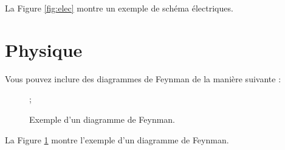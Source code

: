 \noindent La Figure \ref{fig:elec} montre un exemple de schéma électriques.

\section{Physique}

Vous pouvez inclure des diagrammes de Feynman de la manière suivante :

\begin{figure}[H]
  \centering
  ;
  \caption{Exemple d'un diagramme de Feynman.}
  \label{fig:feynman}
\end{figure}

\noindent La Figure \ref{fig:feynman} montre l'exemple d'un diagramme de Feynman.
